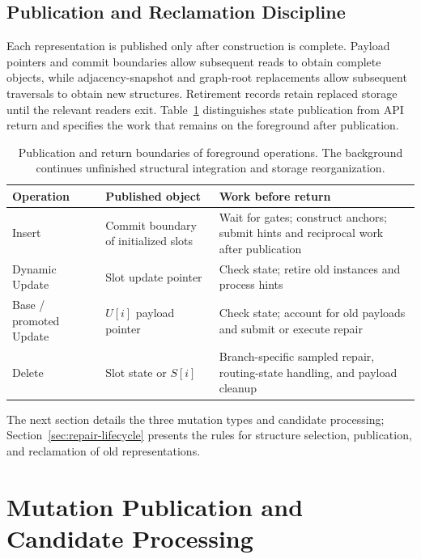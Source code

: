 \documentclass[sigconf,pbalance]{acmart}
\begin{document}
\subsection{Publication and Reclamation Discipline}
\label{sec:foreground-background-contract}

Each representation is published only after construction is complete. Payload pointers and commit boundaries allow subsequent reads to obtain complete objects, while adjacency-snapshot and graph-root replacements allow subsequent traversals to obtain new structures. Retirement records retain replaced storage until the relevant readers exit. Table~\ref{tab:foreground-background-contract} distinguishes state publication from API return and specifies the work that remains on the foreground after publication.

\begin{table}[t]
\centering
\caption{Publication and return boundaries of foreground operations. The background continues unfinished structural integration and storage reorganization.}
\label{tab:foreground-background-contract}
\begingroup\footnotesize
\begin{tabularx}{\columnwidth}{@{}p{}XX@{}}
\toprule
Operation & Published object & Work before return \\
\midrule
Insert & Commit boundary of initialized slots & Wait for gates; construct anchors; submit hints and reciprocal work after publication \\
Dynamic Update & Slot update pointer & Check state; retire old instances and process hints \\
Base / promoted Update & $U[i]$ payload pointer & Check state; account for old payloads and submit or execute repair \\
Delete & Slot state or $S[i]$ & Branch-specific sampled repair, routing-state handling, and payload cleanup \\
\bottomrule
\end{tabularx}\endgroup
\end{table}

The next section details the three mutation types and candidate processing; Section~\ref{sec:repair-lifecycle} presents the rules for structure selection, publication, and reclamation of old representations.

\section{Mutation Publication and Candidate Processing}
\label{sec:foreground-resolution}
\end{document}
